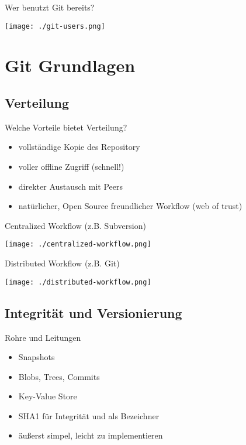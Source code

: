 \begin{frame}{Wer benutzt Git bereits?}
    \centerline{\texttt{[image: ./git-users.png]}}
\end{frame}

\section{Git Grundlagen}

\subsection{Verteilung}

\begin{frame}{Welche Vorteile bietet Verteilung?}
    \begin{itemize}[<+->]
        \item vollständige Kopie des Repository
        \item voller offline Zugriff (schnell!)
        \item direkter Austausch mit Peers
        \item natürlicher, Open Source freundlicher Workflow (web of trust)
    \end{itemize}
\end{frame}


\begin{frame}{Centralized Workflow (z.B. Subversion)}
    \centerline{\texttt{[image: ./centralized-workflow.png]}}
\end{frame}

\begin{frame}{Distributed Workflow (z.B. Git)}
    \centerline{\texttt{[image: ./distributed-workflow.png]}}
\end{frame}

\subsection{Integrität und Versionierung}

\begin{frame}{Rohre und Leitungen}
    \begin{itemize}[<+->]
        \item Snapshots
        \item Blobs, Trees, Commits
        \item Key-Value Store
        \item SHA1 für Integrität und als Bezeichner
        \item äußerst simpel, leicht zu implementieren
    \end{itemize}
\end{frame}

